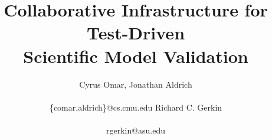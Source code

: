 \documentclass[9pt]{sig-alternate}
\begin{document}
%
\title{Collaborative Infrastructure for Test-Driven \\Scientific Model Validation}


\author{\alignauthor
Cyrus Omar, Jonathan Aldrich\\\\
       {\{comar,aldrich\}@cs.cmu.edu}
       \alignauthor Richard C. Gerkin\\
       \\{rgerkin@asu.edu}
}


% 








\maketitle
\end{document}
